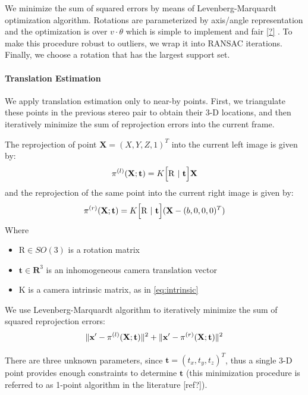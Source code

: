 \documentclass[runningheads]{llncs}
\DeclarePairedDelimiter{\norm}{\lVert}{\rVert}
\begin{document}
We minimize the sum of squared errors by means of Levenberg-Marquardt
optimization algorithm. Rotations are parameterized by axis/angle
representation and the optimization is over $v\cdot \theta$ which is
simple to implement and fair \ref{?} . To make this procedure robust
to outliers, we wrap it into RANSAC iterations.  Finally, we choose a
rotation that has the largest support set.

\paragraph{Translation Estimation} We apply translation estimation
only to near-by points.  First, we triangulate these points in the
previous stereo pair to obtain their 3-D locations, and then
iteratively minimize the sum of reprojection errors into the current
frame.

The reprojection of point $\mathbf{X}=(X,Y,Z,1)^T$ into the current
left image is given by:
\begin{equation}
  \pi^{(l)}(\mathbf{X};\mathbf{t}) =  K\Bigl[ \mathrm{R}\ |\ \mathbf{t} \Bigr]\mathbf{X} 
\end{equation}
and the reprojection of the same point into the current right image is
given by:
\begin{equation}
  \pi^{(r)}(\mathbf{X};\mathbf{t}) =  K\Bigl[ \mathrm{R}\ |\ \mathbf{t} \Bigr](\mathbf{X} - (b,0,0,0)^T)
\end{equation}
Where 
\begin{itemize}
\item $\mathrm{R}\in SO(3)$ is a rotation matrix
\item $\mathbf{t}\in \mathbf{R}^3$ is an inhomogeneous camera translation vector
\item $\mathrm{K}$ is a camera intrinsic matrix, as in \ref{eq:intrinsic}
\end{itemize}

We use Levenberg-Marquardt algorithm to iteratively minimize the sum
of squared reprojection errors:
\begin{equation}
\norm{\mathbf{x'} - \pi^{(l)}(\mathbf{X};\mathbf{t})}^2 + \norm{\mathbf{x'} - \pi^{(r)}(\mathbf{X};\mathbf{t})}^2
\end{equation}

There are three unknown parameters, since $\mathbf{t} =
(t_x,t_y,t_z)^T$, thus a single 3-D point provides enough constraints
to determine $\mathbf{t}$ (this minimization procedure is referred to
as 1-point algorithm in the literature [ref?]).
\end{document}
